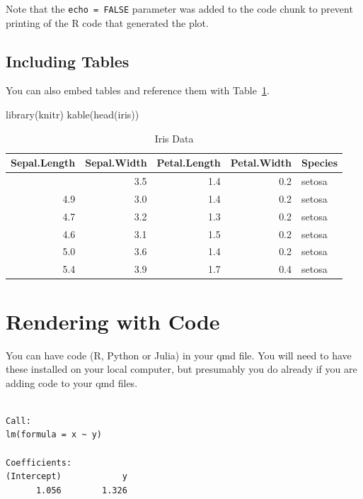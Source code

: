 \documentclass[
  letterpaper,
  oneside,
  open=any]{scrbook}
\newenvironment{Shaded}{\begin{snugshade}}{\end{snugshade}}
\newcommand{\FunctionTok}[1]{\textcolor[rgb]{0.28,0.35,0.67}{#1}}
\newcommand{\NormalTok}[1]{\textcolor[rgb]{0.00,0.23,0.31}{#1}}
\begin{document}
Note that the \texttt{echo\ =\ FALSE} parameter was added to the code
chunk to prevent printing of the R code that generated the plot.

\section{Including Tables}\label{including-tables}

You can also embed tables and reference them with Table~\ref{tbl-iris}.

\begin{Shaded}
\begin{Highlighting}[]
\FunctionTok{library}\NormalTok{(knitr)}
\FunctionTok{kable}\NormalTok{(}\FunctionTok{head}\NormalTok{(iris))}
\end{Highlighting}
\end{Shaded}

\begin{longtable}[]{@{}rrrrl@{}}

\caption{\label{tbl-iris}Iris Data}

\tabularnewline

\toprule\noalign{}
Sepal.Length & Sepal.Width & Petal.Length & Petal.Width & Species \\
\midrule\noalign{}
\endhead
\bottomrule\noalign{}
\endlastfoot
5.1 & 3.5 & 1.4 & 0.2 & setosa \\
4.9 & 3.0 & 1.4 & 0.2 & setosa \\
4.7 & 3.2 & 1.3 & 0.2 & setosa \\
4.6 & 3.1 & 1.5 & 0.2 & setosa \\
5.0 & 3.6 & 1.4 & 0.2 & setosa \\
5.4 & 3.9 & 1.7 & 0.4 & setosa \\

\end{longtable}


\chapter{Rendering with Code}\label{rendering-with-code}

You can have code (R, Python or Julia) in your qmd file. You will need
to have these installed on your local computer, but presumably you do
already if you are adding code to your qmd files.

\begin{verbatim}

Call:
lm(formula = x ~ y)

Coefficients:
(Intercept)            y  
      1.056        1.326  
\end{verbatim}
\end{document}
